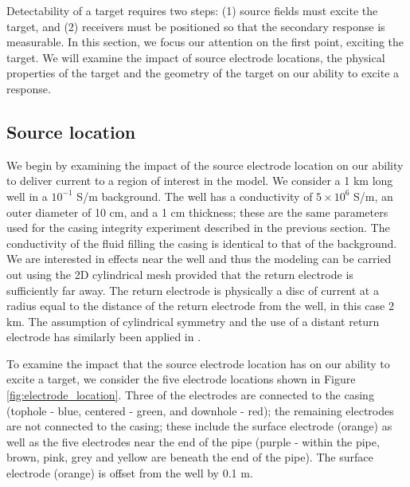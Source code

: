 \documentclass[extra,mreferee]{gji}
\begin{document}
Detectability of a target requires two steps: (1) source fields must excite the target, and (2) receivers must be positioned so that the secondary response is measurable. In this section, we focus our attention on the first point, exciting the target. We will examine the impact of source electrode locations, the physical properties of the target and the geometry of the target on our ability to excite a response.


\subsection{Source location}
We begin by examining the impact of the source electrode location on our ability to deliver current to a region of interest in the model. We consider a 1 km long well in a $10^{-1}$ S/m background. The well has a conductivity of $5 \times 10^6$ S/m, an outer diameter of 10 cm, and a 1 cm thickness; these are the same parameters used for the casing integrity experiment described in the previous section. The conductivity of the fluid filling the casing is identical to that of the background. We are interested in effects near the well and thus the modeling can be carried out using the 2D cylindrical mesh provided that the return electrode is sufficiently far away. The return electrode is physically a disc of current at a radius equal to the distance of the return electrode from the well, in this case 2 km. The assumption of cylindrical symmetry and the use of a distant return electrode has similarly been applied in \cite{Schenkel1991}.

To examine the impact that the source electrode location has on our ability to excite a target, we consider the five electrode locations shown in Figure \ref{fig:electrode_location}. Three of the electrodes are connected to the casing (tophole - blue, centered - green, and downhole - red); the remaining electrodes are  not connected to the casing; these include the surface electrode (orange) as well as the five electrodes near the end of the pipe (purple - within the pipe, brown, pink, grey and yellow are beneath the end of the pipe). The surface electrode (orange) is offset from the well by 0.1 m.




\end{document}
